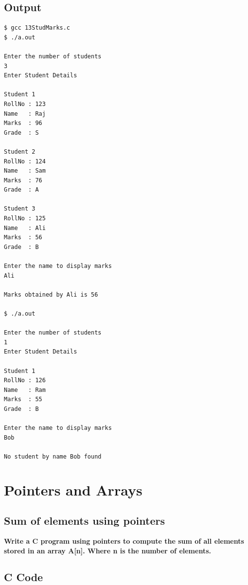 \documentclass[a4paper]{report}
\begin{document}
\section*{Output}
\begin{Verbatim}
$ gcc 13StudMarks.c 
$ ./a.out 

Enter the number of students
3
Enter Student Details

Student 1
RollNo : 123
Name   : Raj
Marks  : 96
Grade  : S

Student 2
RollNo : 124
Name   : Sam
Marks  : 76
Grade  : A 

Student 3
RollNo : 125
Name   : Ali
Marks  : 56
Grade  : B

Enter the name to display marks
Ali

Marks obtained by Ali is 56

$ ./a.out 

Enter the number of students
1
Enter Student Details

Student 1
RollNo : 126
Name   : Ram
Marks  : 55
Grade  : B

Enter the name to display marks
Bob

No student by name Bob found

\end{Verbatim}

\chapter{Pointers and Arrays}
\section{Sum of elements using pointers}
{\selectfont \textbf{Write a C program using pointers to compute the sum of all elements stored in an array A[n]. Where n is the number of elements.
}}

\section*{C Code}
\end{document}
